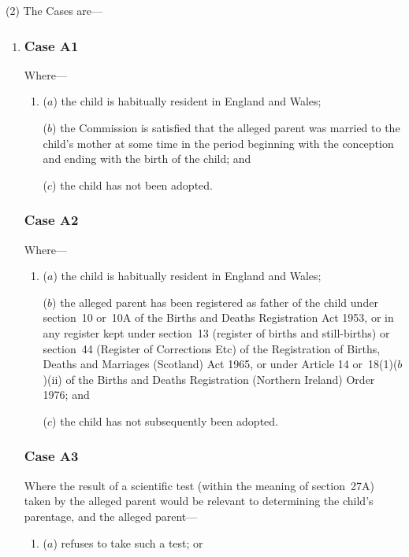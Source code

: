 \documentclass[12pt,a4paper]{article}
\begin{document}
(2) The Cases are—
\begin{enumerate}\item[]
\subsubsection*{Case A1}

Where—
\begin{enumerate}\item[]
($a$) the child is habitually resident in England and Wales;

($b$) the 
Commission  %
is satisfied that the alleged parent was married to the child’s mother at some time in the period beginning with the conception and ending with the birth of the child; and

($c$) the child has not been adopted.
\end{enumerate}

\subsubsection*{Case A2}

Where—
\begin{enumerate}\item[]
($a$) the child is habitually resident in England and Wales;

($b$) the alleged parent has been registered as father of the child under section~10 or~10A of the Births and Deaths Registration Act 1953, or in any register kept under section~13 (register of births and still-births) or section~44 (Register of Corrections Etc) of the Registration of Births, Deaths and Marriages (Scotland) Act 1965, or under Article 14 or~18(1)($b$)(ii)  of the Births and Deaths Registration (Northern Ireland) Order 1976; and

($c$) the child has not subsequently been adopted.
\end{enumerate}

\subsubsection*{Case A3}

Where the result of a scientific test (within the meaning of section~27A) taken by the alleged parent would be relevant to determining the child’s parentage, and the alleged parent—
\begin{enumerate}\item[]
($a$) refuses to take such a test; or


\end{enumerate}
\end{enumerate}
\end{document}
